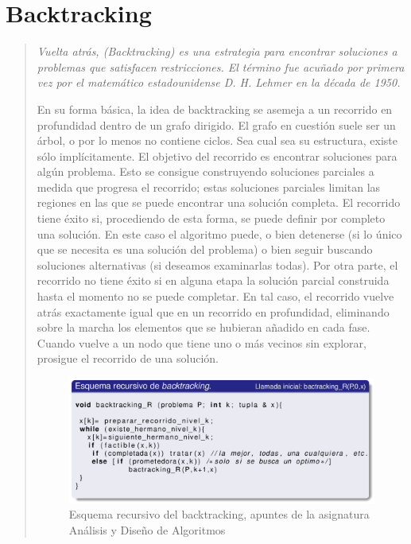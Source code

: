 \documentclass[a4paper,openany,oneside,12pt]{book}
\begin{document}
\section{Backtracking}
\begin{quote}

\em Vuelta atrás, (Backtracking) es una estrategia para encontrar soluciones a problemas que satisfacen restricciones. El término fue acuñado por primera vez por el matemático estadounidense D. H. Lehmer en la década de 1950. 

En su forma básica, la idea de backtracking se asemeja a un recorrido en profundidad dentro de un grafo dirigido. El grafo en cuestión suele ser un árbol, o por lo menos no contiene ciclos. Sea cual sea su estructura, existe sólo implícitamente. El objetivo del recorrido es encontrar soluciones para algún problema. Esto se consigue construyendo soluciones parciales a medida que progresa el recorrido; estas soluciones parciales limitan las regiones en las que se puede encontrar una solución completa. El recorrido tiene éxito si, procediendo de esta forma, se puede definir por completo una solución. En este caso el algoritmo puede, o bien detenerse (si lo único que se necesita es una solución del problema) o bien seguir buscando soluciones alternativas (si deseamos examinarlas todas). Por otra parte, el recorrido no tiene éxito si en alguna etapa la solución parcial construida hasta el momento no se puede completar. En tal caso, el recorrido vuelve atrás exactamente igual que en un recorrido en profundidad, eliminando sobre la marcha los elementos que se hubieran añadido en cada fase. Cuando vuelve a un nodo que tiene uno o más vecinos sin explorar, prosigue el recorrido de una solución. \cite{wiki:backtracking}


\begin{figure}
\centering
\includegraphics[width=\textwidth]{img/backtracking.png}
\caption{Esquema recursivo del backtracking, apuntes de la asignatura Análisis y Diseño de Algoritmos} \label{fig:backtracking}
\end{figure}


\end{quote}
\end{document}
